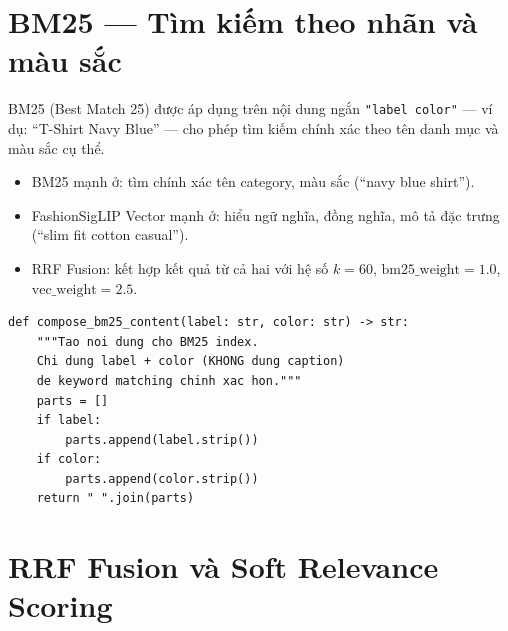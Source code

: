 \documentclass[12pt,a4paper]{report}
\begin{document}
\section{BM25 --- Tìm kiếm theo nhãn và màu sắc}
BM25 (Best Match 25) được áp dụng trên nội dung ngắn \texttt{"label color"} --- ví dụ: ``T-Shirt Navy Blue'' --- cho phép tìm kiếm chính xác theo tên danh mục và màu sắc cụ thể.

\begin{tcolorbox}[title=Phương pháp: Hybrid Search --- BM25 + FashionSigLIP]
\begin{itemize}
    \item BM25 mạnh ở: tìm chính xác tên category, màu sắc (``navy blue shirt'').
    \item FashionSigLIP Vector mạnh ở: hiểu ngữ nghĩa, đồng nghĩa, mô tả đặc trưng (``slim fit cotton casual'').
    \item RRF Fusion: kết hợp kết quả từ cả hai với hệ số $k = 60$, $\text{bm25\_weight}=1.0$, $\text{vec\_weight}=2.5$.
\end{itemize}
\end{tcolorbox}

\begin{lstlisting}[caption={BM25 content composition --- indexing/build\_index.py}]
def compose_bm25_content(label: str, color: str) -> str:
    """Tao noi dung cho BM25 index.
    Chi dung label + color (KHONG dung caption)
    de keyword matching chinh xac hon."""
    parts = []
    if label:
        parts.append(label.strip())
    if color:
        parts.append(color.strip())
    return " ".join(parts)
\end{lstlisting}

\section{RRF Fusion và Soft Relevance Scoring}
\end{document}
